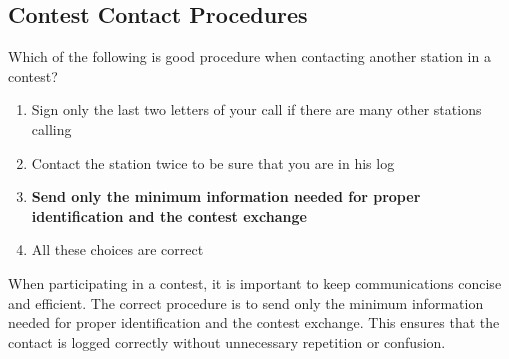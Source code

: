 \subsection{Contest Contact Procedures}
\label{T8C04}

\begin{tcolorbox}[colback=gray!10!white,colframe=black!75!black,title=T8C04]
Which of the following is good procedure when contacting another station in a contest?
\begin{enumerate}[noitemsep]
    \item Sign only the last two letters of your call if there are many other stations calling
    \item Contact the station twice to be sure that you are in his log
    \item \textbf{Send only the minimum information needed for proper identification and the contest exchange}
    \item All these choices are correct
\end{enumerate}
\end{tcolorbox}

When participating in a contest, it is important to keep communications concise and efficient. The correct procedure is to send only the minimum information needed for proper identification and the contest exchange. This ensures that the contact is logged correctly without unnecessary repetition or confusion.